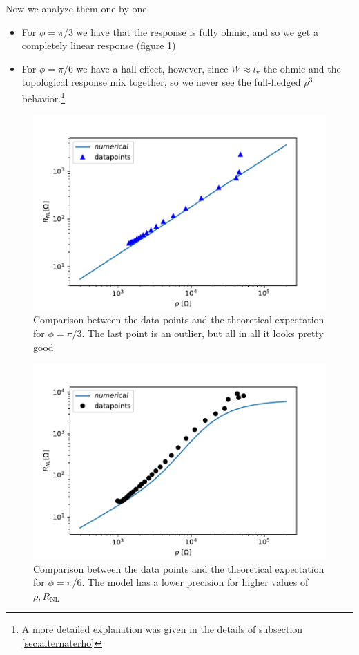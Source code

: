 Now we analyze them one by one
\begin{itemize}
    \item For $\phi=\pi/3$ we have that the response is fully ohmic, and so we get a completely linear response (figure \ref{fig:rebecca pi/3})
    \item For $\phi=\pi/6$ we have a hall effect, however, since $W\approx l_\textrm{v}$ the ohmic and the topological response mix together, so we never see the full-fledged $\rho^3$ behavior.\footnote{A more detailed explanation was given in the details of subsection \ref{sec:alternaterho}}
\end{itemize}
\begin{figure}[h!]
    \centering
    \includegraphics[width=\linewidth]{Immagini/rnl/rebecca_0.pdf}
    \caption{Comparison between the data points and the theoretical expectation for $\phi=\pi/3$. The last point is an outlier, but all in all it looks pretty good}
    \label{fig:rebecca pi/3}
\end{figure}


\begin{figure}[h!]
    \centering
    \includegraphics[width=\linewidth]{Immagini/rnl/rebecca_1.pdf}
    \caption{Comparison between the data points and the theoretical expectation for $\phi=\pi/6$. The model has a lower precision for higher values of $\rho,R_{\textrm{NL}}$}
    \label{fig:rebecca pi/6}
\end{figure}